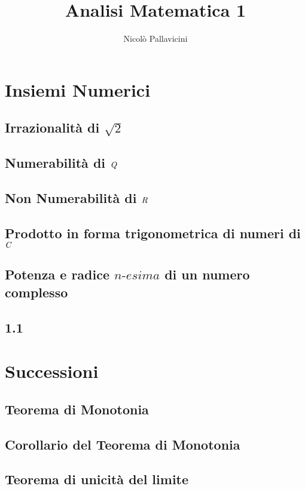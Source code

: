\documentclass[11pt, a4paper]{book}
\author{Nicolò Pallavicini}
\title{Analisi Matematica 1}
\begin{document}
\maketitle

\chapter{Insiemi Numerici}
\section{Irrazionalità di $\sqrt{2}$}
\section{Numerabilità di $\emph{Q}$}
\section{Non Numerabilità di $\emph{R}$}
\section{Prodotto in forma trigonometrica di numeri di $\emph{C}$}
\section{Potenza e radice $\textit{n-esima}$ di un numero complesso}

\newpage
\begin{flushleft}
\section*{1.1}

\end{flushleft}




\chapter{Successioni}
\section{Teorema di Monotonia}
\section{Corollario del Teorema di Monotonia}
\section{Teorema di unicità del limite}
\end{document}
